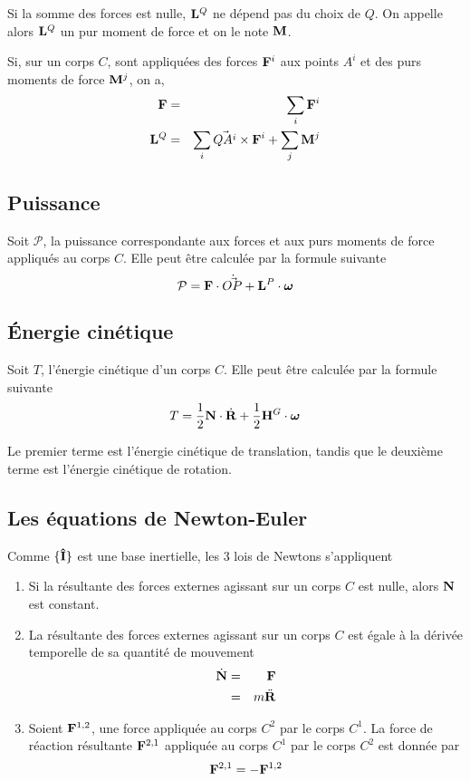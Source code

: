 Si la somme des forces est nulle, ${\bf L}^Q$ ne dépend pas du choix de $Q$.
On appelle alors ${\bf L}^Q$ un pur moment de force et on le note ${\bf M}$.

Si, sur un corps $C$, sont appliquées des forces ${\bf F}^i$ aux points $A^i$ et des purs moments de force ${\bf M}^j$, on a,
\begin{eqnarray*}
  {\bf F} &=& \sum_i {\bf F}^i\\
  {\bf L}^Q &=&  \sum_i \vec{QA^i}\times{\bf F}^i + \sum_j {\bf M}^j
\end{eqnarray*}

\subsection{Puissance}
Soit $\mathcal{P}$, la puissance correspondante aux forces et aux purs moments de force appliqués au corps $C$.
Elle peut être calculée par la formule suivante
\[ \mathcal{P} = {\bf F}\cdot\dot{\vec{ OP}} + {\bf L}^P\cdot{\bm \omega} \]

\subsection{\'Energie cinétique}
Soit $T$, l'énergie cinétique d'un corps $C$.
Elle peut être calculée par la formule suivante
\[ T = \frac{1}{2} {\bf N} \cdot \dot{\bf R} + \frac{1}{2} {\bf H}^G \cdot {\bm \omega} \]

Le premier terme est l'énergie cinétique de translation, tandis que le deuxième
terme est l'énergie cinétique de rotation. 

\subsection{Les équations de Newton-Euler}
Comme $\{{\bf\hat{I}}\}$ est une base inertielle, les 3 lois de Newtons s'appliquent
\begin{enumerate}
  \item Si la résultante des forces externes agissant sur un corps $C$ est nulle, alors ${\bf N}$ est constant.
  \item La résultante des forces externes agissant sur un corps $C$ est égale à la dérivée temporelle de sa quantité de mouvement
    \begin{eqnarray*}
      \dot{{\bf N}} &=& {\bf F}\\
                &=& m \ddot{\bf R}
    \end{eqnarray*}
  \item Soient ${\bf F}^{1,2}$, une force appliquée au corps $C^2$ par le corps $C^1$.
    La force de réaction résultante ${\bf F}^{2,1}$ appliquée au corps $C^1$ par le corps $C^2$ est donnée par
    \[ {\bf F}^{2,1} = -{\bf F}^{1,2} \]
\end{enumerate}


